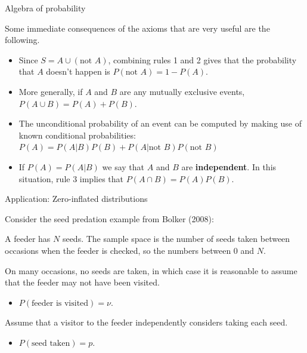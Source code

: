 \documentclass[
  ignorenonframetext,
]{beamer}
\providecommand{\tightlist}{%
  \setlength{\itemsep}{0pt}\setlength{\parskip}{0pt}}
\begin{document}
\begin{frame}{Algebra of probability}
\protect\hypertarget{algebra-of-probability}{}

Some immediate consequences of the axioms that are very useful are the
following.

\begin{itemize}
\tightlist
\item
  Since \(S=A\cup(\text{not }A)\), combining rules 1 and 2 gives that
  the probability that \(A\) doesn't happen is
  \(P(\text{not }A)=1-P(A)\).
\item
  More generally, if \(A\) and \(B\) are any mutually exclusive events,
  \(P(A\cup B)=P(A)+P(B)\).
\item
  The unconditional probability of an event can be computed by making
  use of known conditional probabilities:
  \(P(A)=P(A|B)P(B)+P(A|\text{not }B)P(\text{not }B)\)
\item
  If \(P(A)=P(A|B)\) we say that \(A\) and \(B\) are
  \textbf{independent}. In this situation, rule 3 implies that
  \(P(A\cap B)=P(A)P(B)\).
\end{itemize}

\end{frame}

\begin{frame}{Application: Zero-inflated distributions}
\protect\hypertarget{application-zero-inflated-distributions}{}

Consider the seed predation example from Bolker (2008):

A feeder has \(N\) seeds. The sample space is the number of seeds taken
between occasions when the feeder is checked, so the numbers between
\(0\) and \(N\).

On many occasions, no seeds are taken, in which case it is reasonable to
assume that the feeder may not have been visited.

\begin{itemize}
\tightlist
\item
  \(P(\text{feeder is visited})=\nu\).
\end{itemize}

Assume that a visitor to the feeder independently considers taking each
seed.

\begin{itemize}
\tightlist
\item
  \(P(\text{seed taken})=p\).
\end{itemize}

\end{frame}
\end{document}
